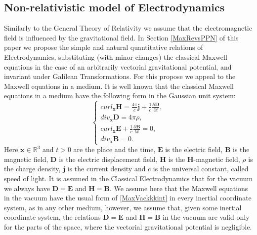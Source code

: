 \documentclass{article}
\theoremstyle{definition}
\theoremstyle{remark}
\renewcommand{\vec}[1]{\mathbf{#1}}
\newcommand{\R}{\mathbb{R}}
\newcommand{\er}{\eqref}
\newcommand{\R}{{\mathbb{R}}}
\newcommand{\er}{\eqref}
\begin{document}
\subsection{Non-relativistic model of Electrodynamics}
Similarly to the General Theory of Relativity we assume that the
electromagnetic field is influenced by the gravitational field. In
Section \ref{MaxRevsPPN} of this paper we propose the simple and
natural quantitative relations of Electrodynamics, substituting
(with minor changes) the classical Maxwell equations in the case of
an arbitrarily vectorial gravitational potential, and invariant
under Galilean Transformations. For this propose we appeal to the
Maxwell equations in a medium. It is well known that
the classical Maxwell equations in a medium have the following form
in the Gaussian unit system:
\begin{equation}
\label{MaxVackkkint}
\begin{cases}
curl_{\vec x} \vec H= \frac{4\pi}{c}\vec j+\frac{1}{c}\frac{\partial \vec D}{\partial t},\\
div_{\vec x} \vec D= 4\pi\rho,\\
curl_{\vec x} \vec E+\frac{1}{c}\frac{\partial \vec B}{\partial t}= 0,\\
div_{\vec x} \vec B= 0.
\end{cases}
\end{equation}
Here $\vec x\in\R^3$ and $t>0$ are the place and the time, $\vec E$
is the electric field, $\vec B$ is the magnetic field, $\vec D$ is
the electric displacement field, $\vec H$ is the $\vec H$-magnetic
field, $\rho$ is the charge density, $\vec j$ is the current density
and $c$ is the universal constant,
called
speed of light.
It is assumed in the Classical Electrodynamics that for the vacuum
we always have $\vec D= \vec E$ and $\vec H=\vec B$. We assume here
that the Maxwell equations in the vacuum have the usual form of
\er{MaxVackkkint} in every inertial coordinate system, as in any
other medium, however, we assume that, given some inertial
coordinate system, the relations $\vec D= \vec E$ and $\vec H=\vec
B$ in the vacuum are valid only for the parts of the space, where
the vectorial gravitational potential is negligible.
\end{document}
